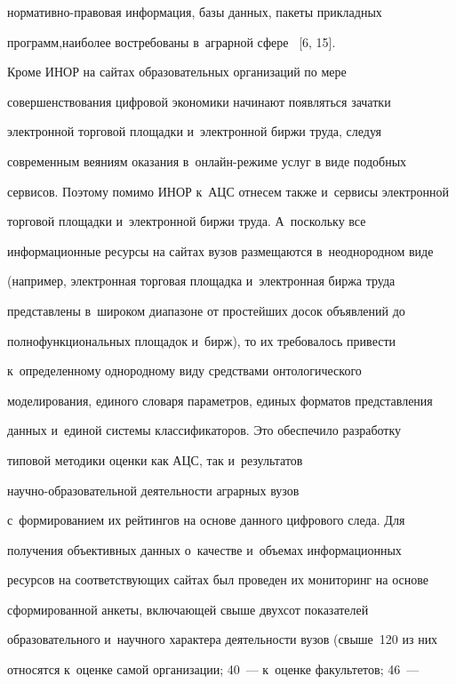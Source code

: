 нор\-ма\-тив\-но-пра\-во\-вая информация, базы данных, пакеты прикладных 


программ,наиболее востребованы в~аграрной сфере~ [6, 15].


  


  Кроме ИНОР на сайтах образовательных организаций по мере 


совершенствования цифровой экономики начинают появляться зачатки 


электронной торговой площадки и~электронной биржи труда, следуя 


современным веяниям оказания в~он\-лайн-ре\-жи\-ме услуг в виде подобных 


сервисов. Поэтому помимо ИНОР к~АЦС отнесем также и~сервисы электронной 


торговой площадки и~электронной биржи труда. А~поскольку все 


информационные ресурсы на сайтах вузов размещаются в~неоднородном виде 


(например, электронная торговая площадка и~электронная биржа труда 


представлены в~широком диапазоне от простейших досок объявлений до 


полнофункциональных площадок и~бирж), то их требовалось привести 


к~определенному однородному виду средствами онтологического 


моделирования, единого словаря параметров, единых форматов представления 


данных и~единой сис\-те\-мы классификаторов. Это обеспечило разработку 


типовой методики оценки как АЦС, так и~результатов  


на\-уч\-но-об\-ра\-зо\-ва\-тель\-ной деятельности аграрных вузов 


с~формированием их рейтингов на основе данного цифрового следа. Для 


получения объективных данных о~качестве и~объемах информационных 


ресурсов на соответствующих сайтах был проведен их мониторинг на основе 


сформированной анкеты, включающей свыше двухсот показателей 


образовательного и~научного характера деятельности вузов (свыше~120 из них 


относятся к~оценке самой организации; 40~--- к~оценке факультетов; 46~--- 


